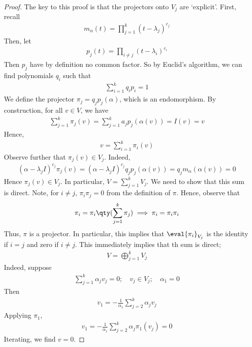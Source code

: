 \begin{proof}
	The key to this proof is that the projectors onto $V_j$ are `explicit'.
	First, recall
	\begin{align*}
		m_\alpha(t) = \prod_{j=1}^k (t-\lambda_j)^{c_j}
	\end{align*}
	Then, let
	\begin{align*}
		p_j(t) = \prod_{i \neq j} (t - \lambda_i)^{c_i}
	\end{align*}
	Then $p_j$ have by definition no common factor.
	So by Euclid's algorithm, we can find polynomials $q_i$ such that
	\begin{align*}
		\sum_{i=1}^k q_i p_i = 1
	\end{align*}
	We define the projector $\pi_j = q_j p_j(\alpha)$, which is an endomorphism.
	By construction, for all $v \in V$, we have
	\begin{align*}
		\sum_{j=1}^k \pi_j(v) = \sum_{j=1}^k a_j p_j(\alpha(v)) = I(v) = v
	\end{align*}
	Hence,
	\begin{align*}
		v = \sum_{i=1}^k \pi_i(v)
	\end{align*}
	Observe further that $\pi_j(v) \in V_j$.
	Indeed,
	\begin{align*}
		(\alpha - \lambda_j I)^{c_j} \pi_j(v) = (\alpha - \lambda_j I)^{c_j} q_j p_j(\alpha(v)) = q_j m_\alpha (\alpha(v)) = 0
	\end{align*}
	Hence $\pi_j(v) \in V_j$.
	In particular, $V = \sum_{j=1}^k V_j$.
	We need to show that this sum is direct.
	Note, for $i \neq j$, $\pi_i \pi_j = 0$ from the definition of $\pi$.
	Hence, observe that
	\begin{align*}
		\pi_i = \pi_i \qty(\sum_{j=1}^k \pi_j) \implies \pi_i = \pi_i \pi_i
	\end{align*}
	Thus, $\pi$ is a projector.
	In particular, this implies that $\eval{\pi_i}_{V_j}$ is the identity if $i = j$ and zero if $i \neq j$.
	This immediately implies that th sum is direct;
	\begin{align*}
		V = \bigoplus_{j=1}^k V_j
	\end{align*}
	Indeed, suppose
	\begin{align*}
		\sum_{j=1}^k \alpha_j v_j = 0;\quad v_j \in V_j;\quad \alpha_1 = 0
	\end{align*}
	Then
	\begin{align*}
		v_1 = -\frac{1}{\alpha_1} \sum_{j=2}^k \alpha_j v_j
	\end{align*}
	Applying $\pi_1$,
	\begin{align*}
		v_1 = -\frac{1}{\alpha_1} \sum_{j=2}^k \alpha_j \pi_1(v_j) = 0
	\end{align*}
	Iterating, we find $v = 0$.
\end{proof}
